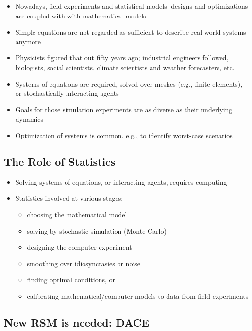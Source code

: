 \documentclass[
  letterpaper,
  DIV=11,
  numbers=noendperiod]{scrreprt}
\providecommand{\tightlist}{%
  \setlength{\itemsep}{0pt}\setlength{\parskip}{0pt}}\usepackage{longtable,booktabs,array}
\begin{document}
\begin{itemize}
\tightlist
\item
  Nowadays, field experiments and statistical models, designs and
  optimizations are coupled with with mathematical models
\item
  Simple equations are not regarded as sufficient to describe real-world
  systems anymore
\item
  Physicists figured that out fifty years ago; industrial engineers
  followed, biologists, social scientists, climate scientists and
  weather forecasters, etc.
\item
  Systems of equations are required, solved over meshes (e.g., finite
  elements), or stochastically interacting agents
\item
  Goals for those simulation experiments are as diverse as their
  underlying dynamics
\item
  Optimization of systems is common, e.g., to identify worst-case
  scenarios
\end{itemize}

\subsection{The Role of Statistics}\label{the-role-of-statistics}

\begin{itemize}
\tightlist
\item
  Solving systems of equations, or interacting agents, requires
  computing
\item
  Statistics involved at various stages:

  \begin{itemize}
  \tightlist
  \item
    choosing the mathematical model
  \item
    solving by stochastic simulation (Monte Carlo)
  \item
    designing the computer experiment
  \item
    smoothing over idiosyncrasies or noise
  \item
    finding optimal conditions, or
  \item
    calibrating mathematical/computer models to data from field
    experiments
  \end{itemize}
\end{itemize}

\subsection{New RSM is needed: DACE}\label{new-rsm-is-needed-dace}
\end{document}
